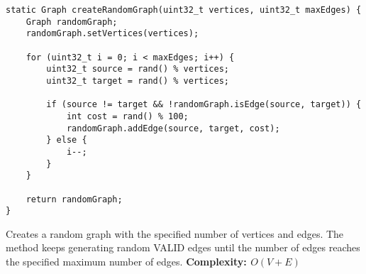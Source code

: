 \documentclass{article}
\begin{document}
\begin{verbatim}
static Graph createRandomGraph(uint32_t vertices, uint32_t maxEdges) {
    Graph randomGraph;
    randomGraph.setVertices(vertices);

    for (uint32_t i = 0; i < maxEdges; i++) {
        uint32_t source = rand() % vertices;
        uint32_t target = rand() % vertices;

        if (source != target && !randomGraph.isEdge(source, target)) {
            int cost = rand() % 100;
            randomGraph.addEdge(source, target, cost);
        } else {
            i--;
        }
    }

    return randomGraph;
}
\end{verbatim}
Creates a random graph with the specified number of vertices and edges. The method keeps generating random VALID edges until the number of edges reaches the specified maximum number of edges.
\textbf{Complexity: $O(V + E)$}
\end{document}
